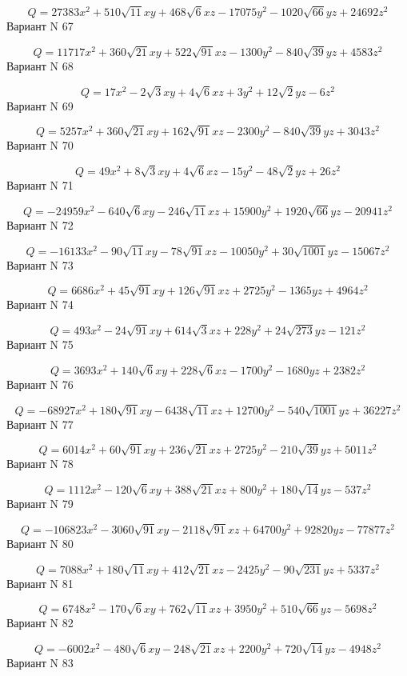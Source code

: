 \documentclass[11pt]{report}
\begin{document}
$$Q = 27383 x^{2} + 510 \sqrt{11} x y + 468 \sqrt{6} x z - 17075 y^{2} - 1020 \sqrt{66} y z + 24692 z^{2}$$Вариант N 67

$$Q = 11717 x^{2} + 360 \sqrt{21} x y + 522 \sqrt{91} x z - 1300 y^{2} - 840 \sqrt{39} y z + 4583 z^{2}$$Вариант N 68

$$Q = 17 x^{2} - 2 \sqrt{3} x y + 4 \sqrt{6} x z + 3 y^{2} + 12 \sqrt{2} y z - 6 z^{2}$$Вариант N 69

$$Q = 5257 x^{2} + 360 \sqrt{21} x y + 162 \sqrt{91} x z - 2300 y^{2} - 840 \sqrt{39} y z + 3043 z^{2}$$Вариант N 70

$$Q = 49 x^{2} + 8 \sqrt{3} x y + 4 \sqrt{6} x z - 15 y^{2} - 48 \sqrt{2} y z + 26 z^{2}$$Вариант N 71

$$Q = - 24959 x^{2} - 640 \sqrt{6} x y - 246 \sqrt{11} x z + 15900 y^{2} + 1920 \sqrt{66} y z - 20941 z^{2}$$Вариант N 72

$$Q = - 16133 x^{2} - 90 \sqrt{11} x y - 78 \sqrt{91} x z - 10050 y^{2} + 30 \sqrt{1001} y z - 15067 z^{2}$$Вариант N 73

$$Q = 6686 x^{2} + 45 \sqrt{91} x y + 126 \sqrt{91} x z + 2725 y^{2} - 1365 y z + 4964 z^{2}$$Вариант N 74

$$Q = 493 x^{2} - 24 \sqrt{91} x y + 614 \sqrt{3} x z + 228 y^{2} + 24 \sqrt{273} y z - 121 z^{2}$$Вариант N 75

$$Q = 3693 x^{2} + 140 \sqrt{6} x y + 228 \sqrt{6} x z - 1700 y^{2} - 1680 y z + 2382 z^{2}$$Вариант N 76

$$Q = - 68927 x^{2} + 180 \sqrt{91} x y - 6438 \sqrt{11} x z + 12700 y^{2} - 540 \sqrt{1001} y z + 36227 z^{2}$$Вариант N 77

$$Q = 6014 x^{2} + 60 \sqrt{91} x y + 236 \sqrt{21} x z + 2725 y^{2} - 210 \sqrt{39} y z + 5011 z^{2}$$Вариант N 78

$$Q = 1112 x^{2} - 120 \sqrt{6} x y + 388 \sqrt{21} x z + 800 y^{2} + 180 \sqrt{14} y z - 537 z^{2}$$Вариант N 79

$$Q = - 106823 x^{2} - 3060 \sqrt{91} x y - 2118 \sqrt{91} x z + 64700 y^{2} + 92820 y z - 77877 z^{2}$$Вариант N 80

$$Q = 7088 x^{2} + 180 \sqrt{11} x y + 412 \sqrt{21} x z - 2425 y^{2} - 90 \sqrt{231} y z + 5337 z^{2}$$Вариант N 81

$$Q = 6748 x^{2} - 170 \sqrt{6} x y + 762 \sqrt{11} x z + 3950 y^{2} + 510 \sqrt{66} y z - 5698 z^{2}$$Вариант N 82

$$Q = - 6002 x^{2} - 480 \sqrt{6} x y - 248 \sqrt{21} x z + 2200 y^{2} + 720 \sqrt{14} y z - 4948 z^{2}$$Вариант N 83
\end{document}

